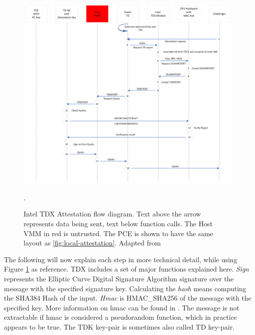 \begin{figure}
\centering
\includegraphics[width=\textwidth]{figures/Attestation Diagram.png}
\caption{Intel TDX Attestation flow diagram. Text above the arrow represents data being sent, text below function calls. The Host VMM in red is untrusted. The PCE is shown to have the same layout as \cref{fig:local-attestation}. Adapted from \cite{sardar_demystifying_2021}}.
\label{fig:QuoteGeneration}
\end{figure}
The following will now explain each step in more technical detail, while using Figure \ref{fig:QuoteGeneration} as reference. 
TDX includes a set of major functions explained here. \textit{Sign} represents the Elliptic Curve Digital Signature Algorithm signature over the message with the specified signature key. 
Calculating the \textit{hash} means computing the SHA384 Hash of the input. \textit{Hmac} is HMAC\_SHA256 of the message with the specified key. More information on hmac can be found in \cite{hmac_keying_1996}. The message is not extractable if hmac is considered a pseudorandom function, which in practice appears to be true\cite{bellare_new_2006}. The TDK key-pair is sometimes also called TD key-pair.
